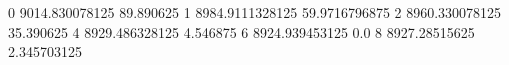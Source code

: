 0 9014.830078125 89.890625
1 8984.9111328125 59.9716796875
2 8960.330078125 35.390625
4 8929.486328125 4.546875
6 8924.939453125 0.0
8 8927.28515625 2.345703125
